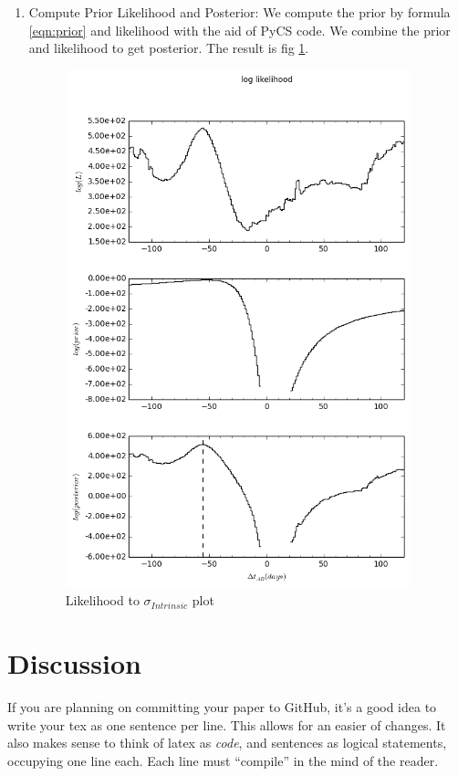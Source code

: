 \documentclass[\docopts]{\docclass}
\begin{document}
\begin{enumerate}
\item Compute Prior Likelihood and Posterior:
We compute the prior by formula \ref{eqn:prior} and likelihood with the aid of PyCS code.  We combine the prior and likelihood to get posterior. The result is fig \ref{fig:log_data1}. 
\begin{figure}[!h]
\includegraphics[width=\textwidth, height=15cm, keepaspectratio]{data1_full_log.png}
\caption{Likelihood to $\sigma_{Intrinsic}$ plot}
\label{fig:log_data1}
\end{figure}
\end{enumerate}




\section{Discussion}
\label{sec:discussion}

If you are planning on committing your paper to GitHub, it's a good idea to write your tex as one sentence per line.
This allows for an easier  of changes.
It also makes sense to think of latex as \emph{code}, and sentences as logical statements, occupying one line each.
Each line must ``compile'' in the mind of the reader.
\end{document}
